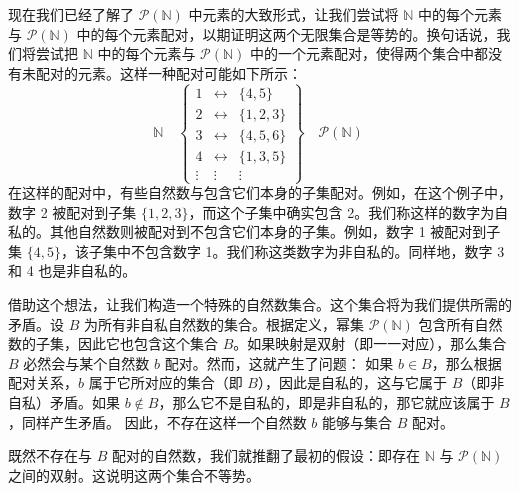 现在我们已经了解了 $\mathcal{P}(\mathbb{N})$ 中元素的大致形式，让我们尝试将 $\mathbb{N}$ 中的每个元素与 $\mathcal{P}(\mathbb{N})$ 中的每个元素配对，以期证明这两个无限集合是等势的。换句话说，我们将尝试把 $\mathbb{N}$ 中的每个元素与 $\mathcal{P}(\mathbb{N})$ 中的一个元素配对，使得两个集合中都没有未配对的元素。这样一种配对可能如下所示：
$$
\mathbb{N} \quad
\begin{Bmatrix}
1 & \longleftrightarrow & \{4, 5\} \\
2 & \longleftrightarrow & \{1, 2, 3\} \\
3 & \longleftrightarrow & \{4, 5, 6\} \\
4 & \longleftrightarrow & \{1, 3, 5\} \\
\vdots & \vdots & \vdots
\end{Bmatrix}
\quad \mathcal{P}(\mathbb{N})~
$$
在这样的配对中，有些自然数与包含它们本身的子集配对。例如，在这个例子中，数字 2 被配对到子集 $\{1, 2, 3\}$，而这个子集中确实包含 2。我们称这样的数字为自私的。其他自然数则被配对到不包含它们本身的子集。例如，数字 1 被配对到子集 $\{4, 5\}$，该子集中不包含数字 1。我们称这类数字为非自私的。同样地，数字 3 和 4 也是非自私的。

借助这个想法，让我们构造一个特殊的自然数集合。这个集合将为我们提供所需的矛盾。设 $B$ 为所有非自私自然数的集合。根据定义，幂集 $\mathcal{P}(\mathbb{N})$ 包含所有自然数的子集，因此它也包含这个集合 $B$。如果映射是双射（即一一对应），那么集合 $B$ 必然会与某个自然数 $b$ 配对。然而，这就产生了问题： 如果 $b \in B$，那么根据配对关系，$b$ 属于它所对应的集合（即 $B$），因此是自私的，这与它属于 $B$（即非自私）矛盾。如果 $b \notin B$，那么它不是自私的，即是非自私的，那它就应该属于 $B$，同样产生矛盾。
因此，不存在这样一个自然数 $b$ 能够与集合 $B$ 配对。

既然不存在与 $B$ 配对的自然数，我们就推翻了最初的假设：即存在 $\mathbb{N}$ 与 $\mathcal{P}(\mathbb{N})$ 之间的双射。这说明这两个集合不等势。

